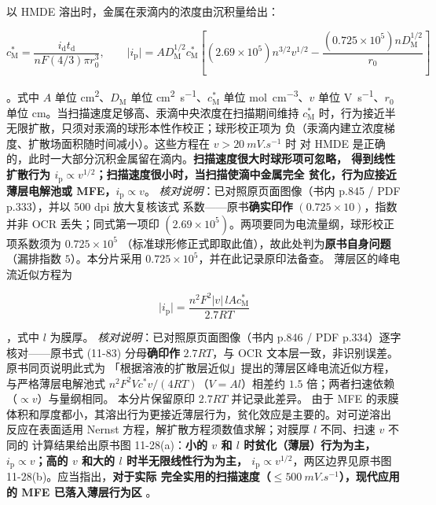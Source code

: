 以 HMDE 溶出时，金属在汞滴内的浓度由沉积量给出：

\begin{equation}
c_{\mathrm{M}}^{*}=\frac{i_{\mathrm{d}}t_{\mathrm{d}}}{nF(4/3)\pi r_0^{3}},
\qquad
\lvert i_{\mathrm{p}}\rvert=AD_{\mathrm{M}}^{1/2}c_{\mathrm{M}}^{*}
\left[(2.69\times10^{5})n^{3/2}v^{1/2}
-\frac{(0.725\times10^{5})nD_{\mathrm{M}}^{1/2}}{r_0}\right]
\label{eq:strip-ip}
\end{equation}

。式中 $A$ 单位 \unit{cm^2}、$D_{\mathrm{M}}$
单位 \unit{cm^2.s^{-1}}、$c_{\mathrm{M}}^{*}$ 单位 \unit{mol.cm^{-3}}、$v$ 单位
\unit{V.s^{-1}}、$r_0$ 单位 cm。当扫描速度足够高、汞滴中央浓度在扫描期间维持
$c_{\mathrm{M}}^{*}$ 时，行为接近半无限扩散，只须对汞滴的球形本性作校正；球形校正项为
负（汞滴内建立浓度梯度、扩散场面积随时间减小）。这些方程在 $v>\qty{20}{mV.s^{-1}}$ 时
对 HMDE 是正确的，此时一大部分沉积金属留在滴内。\textbf{扫描速度很大时球形项可忽略，
得到线性扩散行为 $i_{\mathrm{p}}\propto v^{1/2}$；扫描速度很小时，当扫描使滴中金属完全
贫化，行为应接近薄层电解池或 MFE，$i_{\mathrm{p}}\propto v$}。
\emph{核对说明}：已对照原页面图像（书内 p.845 / PDF p.333），并以 500 dpi 放大复核该式
系数——原书\textbf{确实印作} $(0.725\times10)$，指数并非 OCR 丢失；同式第一项印
$(2.69\times10^{5})$。两项要同为电流量纲，球形校正项系数须为 $0.725\times10^{5}$
（标准球形修正式即取此值），故此处判为\textbf{原书自身问题}（漏排指数 $5$）。本分片采用
$0.725\times10^{5}$，并在此记录原印法备查。
薄层区的峰电流近似方程为

\begin{equation}
\lvert i_{\mathrm{p}}\rvert=\frac{n^{2}F^{2}\lvert v\rvert\,lAc_{\mathrm{M}}^{*}}{2.7RT}
\label{eq:strip-thin}
\end{equation}

，式中 $l$ 为膜厚。
\emph{核对说明}：已对照原页面图像（书内 p.846 / PDF p.334）逐字核对——原书式 (11-83)
分母\textbf{确印作} $2.7RT$，与 OCR 文本层一致，非识别误差。原书同页说明此式为
「根据溶液的扩散层近似」提出的薄层区峰电流近似方程，与严格薄层电解池式
$n^{2}F^{2}Vc^{*}v/(4RT)$（$V=Al$）相差约 $1.5$ 倍；两者扫速依赖（$\propto v$）与量纲相同。
本分片保留原印 $2.7RT$ 并记录此差异。
由于 MFE 的汞膜体积和厚度都小，其溶出行为更接近薄层行为，贫化效应是主要的。对可逆溶出
反应在表面适用 Nernst 方程，解扩散方程须数值求解；对膜厚 $l$ 不同、扫速 $v$ 不同的
计算结果给出原书图 11-28(a)：\textbf{小的 $v$ 和 $l$ 时贫化（薄层）行为为主，
$i_{\mathrm{p}}\propto v$；高的 $v$ 和大的 $l$ 时半无限线性行为为主，
$i_{\mathrm{p}}\propto v^{1/2}$}，两区边界见原书图 11-28(b)。应当指出，\textbf{对于实际
完全实用的扫描速度（$\le \qty{500}{mV.s^{-1}}$），现代应用的 MFE 已落入薄层行为区}
。

